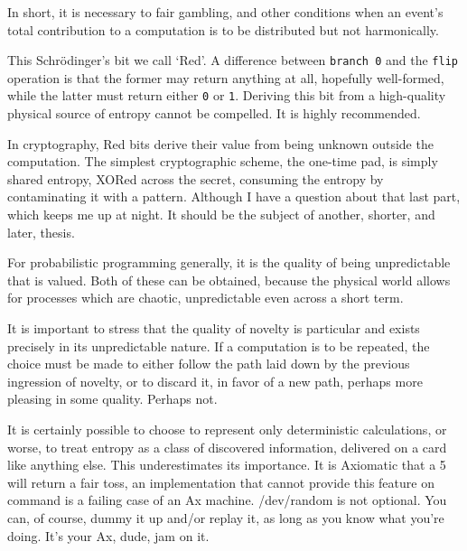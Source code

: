 \documentclass[twoside]{article}
\begin{document}
In short, it is necessary to fair gambling, and other conditions when an event's total contribution to a computation is to be distributed but not harmonically.

This Schrödinger's bit we call `Red'. A difference between \texttt{branch 0} and the \texttt{flip} operation is that the former may return anything at all, hopefully well-formed, while the latter must return either \texttt{0} or \texttt{1}. Deriving this bit from a high-quality physical source of entropy cannot be compelled. It is highly recommended.

In cryptography, Red bits derive their value from being unknown outside the computation. The simplest cryptographic scheme, the one-time pad, is simply shared entropy, XORed across the secret, consuming the entropy by contaminating it with a pattern. Although I have a question about that last part, which keeps me up at night. It should be the subject of another, shorter, and later, thesis.

For probabilistic programming generally, it is the quality of being unpredictable that is valued. Both of these can be obtained, because the physical world allows for processes which are chaotic, unpredictable even across a short term.

It is important to stress that the quality of novelty is particular and exists precisely in its unpredictable nature. If a computation is to be repeated, the choice must be made to either follow the path laid down by the previous ingression of novelty, or to discard it, in favor of a new path, perhaps more pleasing in some quality. Perhaps not.

It is certainly possible to choose to represent only deterministic calculations, or worse, to treat entropy as a class of discovered information, delivered on a card like anything else. This underestimates its importance. It is Axiomatic that a 5 will return a fair toss, an implementation that cannot provide this feature on command is a failing case of an Ax machine. /dev/random is not optional. You can, of course, dummy it up and/or replay it, as long as you know what you're doing. It's your Ax, dude, jam on it.
\end{document}
